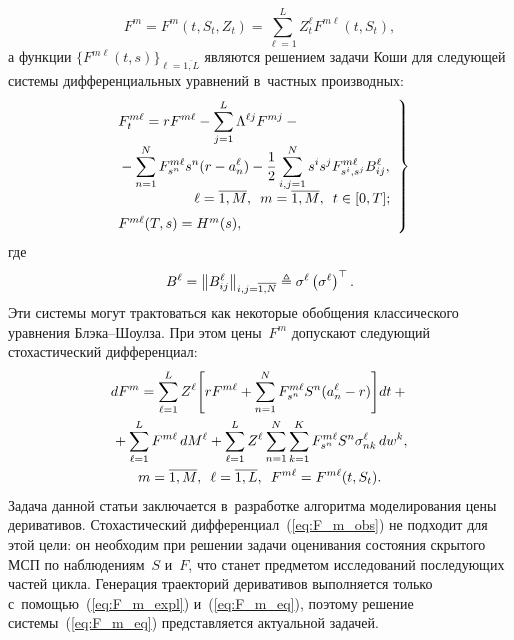 \begin{multicols}{2}
\noindent
\begin{equation}
F^m = F^m \left(t, S_t, Z_t\right) = \sum\limits_{\ell=1}^L Z_t^{\ell} F^{m\ell} \left(t, S_t\right),
\label{eq:F_m_expl}
\end{equation}
а функции $\{F^{m\ell} (t, s)\}_{\ell = \overline{1,L}}$ являются решением задачи Коши для сле\-ду\-ющей 
сис\-те\-мы дифференциальных уравнений в~част\-ных про\-из\-вод\-ных:
\begin{equation}
\left.
\begin{array}{l}
\displaystyle F_t^{m\ell} = rF^{m\ell} - \sum\limits_{j=1}^L \Lambda^{\ell j}F^{mj} - {}\\[6pt]
\displaystyle {}-\sum\limits_{n=1}^N F_{s^n}^{m\ell}s^n(r-a_n^{\ell} ) - \fr{1}{2} \sum\limits_{i,j=1}^N s^is^j F_{s^i,s^j}^{m\ell}B_{ij}^{\ell},\\[9pt]
  \hspace*{19mm}\ell=\overline{1,M}, \enskip m=\overline{1,M}, \enskip t \in [0,T];\\[6pt]
F^{m\ell}(T,s) = H^m(s),
\label{eq:F_m_eq}
\end{array}
\right\}
\end{equation}
где 
$$
B^{\ell} = \left\|B_{ij}^{\ell}\right\|_{i,j=\overline{1,N}} \hm\triangleq \sigma^{\ell}\left( \sigma^{\ell} \right)^{\top}.$$
Эти сис\-те\-мы могут трактоваться как некоторые обобщения классического уравнения
Блэ\-ка--Шоул\-за. При этом цены~$F^m$ допускают сле\-ду\-ющий сто\-ха\-сти\-че\-ский диф\-фе\-рен\-циал:
  \begin{multline}
dF^{m} =
 \sum\limits_{\ell=1}^L Z^{\ell}
 \Bigg[
 r F^{m\ell} + \sum\limits_{n=1}^N F_{s^n}^{m\ell} S^n(a_n^{\ell} - r)
 \Bigg]dt + {}\\
 {}+  \sum\limits_{\ell=1}^L F^{m\ell}\,dM^{\ell} +
 \sum\limits_{\ell=1}^L Z^{\ell} \sum\limits_{n=1}^N \sum\limits_{k=1}^K F_{s^n}^{m\ell} S^n \sigma_{nk}^{\ell}\,dw^k, \\
 m=\overline{1,M}, \enskip
 {\ell}=\overline{1,L}, \enskip
 F^{m\ell}= F^{m\ell}(t,S_t).
\label{eq:F_m_obs}
\end{multline}
Задача данной статьи заключается в~разработке алгоритма моделирования цены деривативов. Сто\-ха\-сти\-че\-ский дифференциал~(\ref{eq:F_m_obs}) 
не подходит для этой цели: он необходим при решении задачи оценивания со\-сто\-яния скрытого МСП по наблюдениям~$S$ и~$F$, 
что станет предметом исследований по\-сле\-ду\-ющих час\-тей цикла. Генерация траекторий деривативов выполняется только с~по\-мощью~(\ref{eq:F_m_expl}) 
и~(\ref{eq:F_m_eq}), поэтому решение сис\-те\-мы~(\ref{eq:F_m_eq}) пред\-став\-ля\-ет\-ся актуальной задачей.


\end{multicols}
